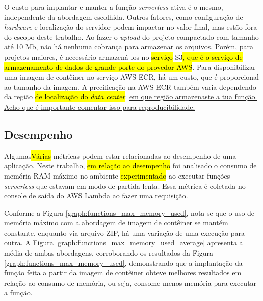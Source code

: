 \documentclass[10pt,conference]{IEEEtran}
\begin{document}
O custo para implantar e manter a função \textit{serverless} ativa é o mesmo, independente da abordagem escolhida. Outros fatores, como configuração de \textit{hardware} e localização do servidor podem impactar no valor final, mas estão fora do escopo deste trabalho.
Ao fazer o \textit{upload} do projeto compactado com tamanho até 10 Mb, não há nenhuma cobrança para armazenar os arquivos. Porém, para projetos maiores, é necessário armazená-los no \hl{serviço} S3\hl{, que é o serviço de armazenamento de dados de grande porte do provedor AWS}. Para disponibilizar uma imagem de contêiner no serviço AWS ECR, há um custo, que é proporcional ao tamanho da imagem. A precificação na AWS ECR também varia dependendo da região \cite{aws_2023_ecr_pricing} \hl{de localização do \textit{data center}}. \ul{em que região armazenaste a tua função. Acho que é importante comentar isso para reproducibilidade.}

\subsection{Desempenho}
\label{subsec:performance}

\st{Algumas}\hl{Várias} métricas podem estar relacionadas ao desempenho de uma aplicação. Neste trabalho, \hl{em relação ao desempenho} foi analisado o consumo de memória RAM máximo no ambiente \hl{experimentado} ao executar funções \textit{serverless} que estavam em modo de partida lenta. Essa métrica é coletada no console de saída do AWS Lambda ao fazer uma requisição.

Conforme a Figura \ref{graph:functions_max_memory_used}, nota-se que o uso de memória máximo com a abordagem de imagem de contêiner se mantém constante, enquanto via arquivo ZIP, há uma variação de uma execução para outra. A Figura \ref{graph:functions_max_memory_used_average} apresenta a média de ambas abordagens, corroborando os resultados da Figura \ref{graph:functions_max_memory_used}, demonstrando que a implantação da função feita a partir da imagem de contêiner obteve melhores resultados em relação ao consumo de memória, ou seja, consome menos memória para executar a função. 
\end{document}
